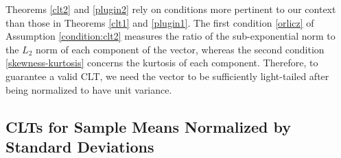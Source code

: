 \documentclass[mnsc,blindrev]{informs4} %
\begin{document}
Theorems \ref{clt2} and \ref{plugin2} rely on conditions more pertinent to our context than those in Theorems \ref{clt1} and \ref{plugin1}. The first condition \eqref{orlicz} of Assumption \ref{condition:clt2} measures the ratio of the sub-exponential norm to the $L_2$ norm of each component of the vector, whereas the second condition \eqref{skewness-kurtosis} concerns the kurtosis of each component. Therefore, to guarantee a valid CLT, we need the vector to be sufficiently light-tailed after being normalized to have unit variance.

\subsection{CLTs for Sample Means Normalized by Standard Deviations}\label{clt:extension to normalized case}
\end{document}
